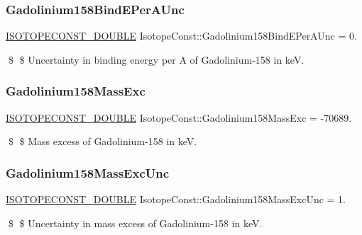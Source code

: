 \subsubsection{\texorpdfstring{Gadolinium158\+Bind\+E\+Per\+A\+Unc}{Gadolinium158BindEPerAUnc}}
{\footnotesize\ttfamily \mbox{\hyperlink{group___isotope_const-_macros_ga8f45a7272ce02c0b4c65c44636ed719a}{I\+S\+O\+T\+O\+P\+E\+C\+O\+N\+S\+T\+\_\+\+D\+O\+U\+B\+LE}} Isotope\+Const\+::\+Gadolinium158\+Bind\+E\+Per\+A\+Unc = 0.}

\$ \$ Uncertainty in binding energy per A of Gadolinium-\/158 in keV. \mbox{\label{group___isotope_const-_gadolinium-_gd158_gabfe9a8ccfbe496636c179046c4a859a7}} 
\subsubsection{\texorpdfstring{Gadolinium158\+Mass\+Exc}{Gadolinium158MassExc}}
{\footnotesize\ttfamily \mbox{\hyperlink{group___isotope_const-_macros_ga8f45a7272ce02c0b4c65c44636ed719a}{I\+S\+O\+T\+O\+P\+E\+C\+O\+N\+S\+T\+\_\+\+D\+O\+U\+B\+LE}} Isotope\+Const\+::\+Gadolinium158\+Mass\+Exc = -\/70689.}

\$ \$ Mass excess of Gadolinium-\/158 in keV. \mbox{\label{group___isotope_const-_gadolinium-_gd158_ga9bdd69900a2fcd1bfae24375f9a39c32}} 
\subsubsection{\texorpdfstring{Gadolinium158\+Mass\+Exc\+Unc}{Gadolinium158MassExcUnc}}
{\footnotesize\ttfamily \mbox{\hyperlink{group___isotope_const-_macros_ga8f45a7272ce02c0b4c65c44636ed719a}{I\+S\+O\+T\+O\+P\+E\+C\+O\+N\+S\+T\+\_\+\+D\+O\+U\+B\+LE}} Isotope\+Const\+::\+Gadolinium158\+Mass\+Exc\+Unc = 1.}

\$ \$ Uncertainty in mass excess of Gadolinium-\/158 in keV. \mbox{\label{group___isotope_const-_gadolinium-_gd158_ga1e52e6b097016e9915847048584fb257}} 
